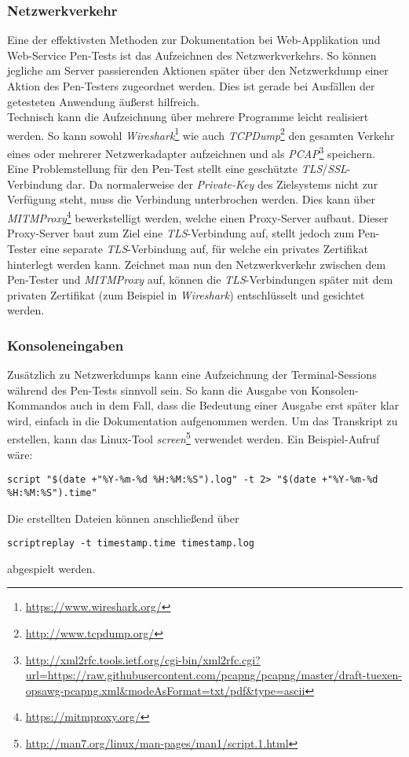 		\subsubsection{Netzwerkverkehr}
		Eine der effektivsten Methoden zur Dokumentation bei Web-Applikation und Web-Service Pen-Tests ist das Aufzeichnen des Netzwerkverkehrs. So können jegliche am Server passierenden Aktionen später über den Netzwerkdump einer Aktion des Pen-Testers zugeordnet werden. Dies ist gerade bei Ausfällen der getesteten Anwendung äußerst hilfreich.\\
		
		Technisch kann die Aufzeichnung über mehrere Programme leicht realisiert werden. So kann sowohl \textit{Wireshark}\footnote{\url{https://www.wireshark.org/}} wie auch \textit{TCPDump}\footnote{\url{http://www.tcpdump.org/}} den gesamten Verkehr eines oder mehrerer Netzwerkadapter aufzeichnen und als \textit{PCAP}\footnote{\url{http://xml2rfc.tools.ietf.org/cgi-bin/xml2rfc.cgi?url=https://raw.githubusercontent.com/pcapng/pcapng/master/draft-tuexen-opsawg-pcapng.xml&modeAsFormat=txt/pdf&type=ascii}} speichern.\\
		
		Eine Problemstellung für den Pen-Test stellt eine geschützte \textit{TLS}/\textit{SSL}-Verbindung dar. Da normalerweise der \textit{Private-Key} des Zielsystems nicht zur Verfügung steht, muss die Verbindung unterbrochen werden. Dies kann über \textit{MITMProxy}\footnote{\url{https://mitmproxy.org/}} bewerkstelligt werden, welche einen Proxy-Server aufbaut. Dieser Proxy-Server baut zum Ziel eine \textit{TLS}-Verbindung auf, stellt jedoch zum Pen-Tester eine separate \textit{TLS}-Verbindung auf, für welche ein privates Zertifikat hinterlegt werden kann. Zeichnet man nun den Netzwerkverkehr zwischen dem Pen-Tester und \textit{MITMProxy} auf, können die \textit{TLS}-Verbindungen später mit dem privaten Zertifikat (zum Beispiel in \textit{Wireshark}) entschlüsselt und gesichtet werden.
		
		\subsubsection{Konsoleneingaben}
		Zusätzlich zu Netzwerkdumps kann eine Aufzeichnung der Terminal-Sessions während des Pen-Tests sinnvoll sein. So kann die Ausgabe von Konsolen-Kommandos auch in dem Fall, dass die Bedeutung einer Ausgabe erst später klar wird, einfach in die Dokumentation aufgenommen werden. Um das Transkript zu erstellen, kann das Linux-Tool \textit{screen}\footnote{\url{http://man7.org/linux/man-pages/man1/script.1.html}} verwendet werden. Ein Beispiel-Aufruf wäre:
\lstset{language=bash}
\begin{lstlisting}
script "$(date +"%Y-%m-%d %H:%M:%S").log" -t 2> "$(date +"%Y-%m-%d %H:%M:%S").time"
\end{lstlisting}
Die erstellten Dateien können anschließend über 
\begin{lstlisting}
scriptreplay -t timestamp.time timestamp.log
\end{lstlisting}
abgespielt werden.
		
